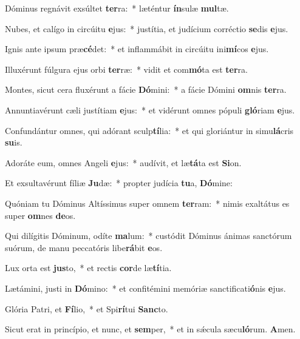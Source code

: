\item Dóminus regnávit exsúltet \textbf{ter}ra:~* læténtur \textbf{ín}sulæ \textbf{mul}tæ.

\item Nubes, et calígo in circúitu \textbf{e}jus:~* justítia, et judícium corréctio \textbf{se}dis \textbf{e}jus.

\item Ignis ante ipsum præ\textbf{cé}det:~* et inflammábit in circúitu ini\textbf{mí}cos \textbf{e}jus.

\item Illuxérunt fúlgura ejus orbi \textbf{ter}ræ:~* vidit et com\textbf{mó}ta est \textbf{ter}ra.

\item Montes, sicut cera fluxérunt a fácie \textbf{Dó}mini:~* a fácie Dómini \textbf{om}nis \textbf{ter}ra.

\item Annuntiavérunt cæli justítiam \textbf{e}jus:~* et vidérunt omnes pópuli \textbf{gló}riam \textbf{e}jus.

\item Confundántur omnes, qui adórant sculp\textbf{tí}lia:~* et qui gloriántur in simu\textbf{lá}cris \textbf{su}is.

\item Adoráte eum, omnes Angeli \textbf{e}jus:~* audívit, et læ\textbf{tá}ta est \textbf{Si}on.

\item Et exsultavérunt fíliæ \textbf{Ju}dæ:~* propter judícia \textbf{tu}a, \textbf{Dó}mine:

\item Quóniam tu Dóminus Altíssimus super omnem \textbf{ter}ram:~* nimis exaltátus es super \textbf{om}nes \textbf{de}os.

\item Qui dilígitis Dóminum, odíte \textbf{ma}lum:~* custódit Dóminus ánimas sanctórum suórum, de manu peccatóris libe\textbf{rá}bit \textbf{e}os.

\item Lux orta est \textbf{jus}to,~* et rectis \textbf{cor}de læ\textbf{tí}tia.

\item Lætámini, justi in \textbf{Dó}mino:~* et confitémini memóriæ sanctificati\textbf{ó}nis \textbf{e}jus.

\item Glória Patri, et \textbf{Fí}lio,~* et Spi\textbf{rí}tui \textbf{Sanc}to.

\item Sicut erat in princípio, et nunc, et \textbf{sem}per,~* et in sǽcula sæcu\textbf{ló}rum. \textbf{A}men.
